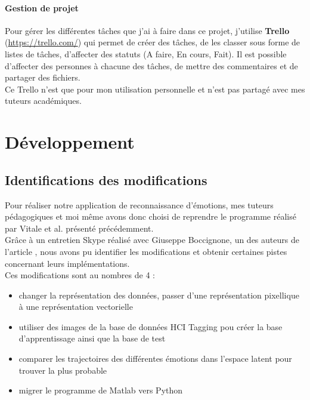 \documentclass[poster]{polytech/polytech}
\begin{document}
\subsection{Gestion de projet}
Pour gérer les différentes tâches que j'ai à faire dans ce projet, j'utilise \textbf{Trello} (\url{https://trello.com/}) qui permet de créer des tâches, de les classer sous forme de listes de tâches, d'affecter des statuts (A faire, En cours, Fait). Il est possible d'affecter des personnes à chacune des tâches, de mettre des commentaires et de partager des fichiers.\\
Ce Trello n'est que pour mon utilisation personnelle et n'est pas partagé avec mes tuteurs académiques.


\part{Développement}
\label{part:part_dev}

\chapter{Identifications des modifications}
Pour réaliser notre application de reconnaissance d'émotions, mes tuteurs pédagogiques et moi même avons donc choisi de reprendre le programme réalisé par Vitale et al. présenté précédemment.\\
Grâce à un entretien Skype réalisé avec Giuseppe Boccignone, un des auteurs de l'article \cite{italiens}, nous avons pu identifier les modifications et obtenir certaines pistes concernant leurs implémentations.\\
Ces modifications sont au nombres de 4 :
\begin{itemize}
\item changer la représentation des données, passer d'une représentation pixellique à une représentation vectorielle
\item utiliser des images de la base de données HCI Tagging pou créer la base d'apprentissage ainsi que la base de test
\item comparer les trajectoires des différentes émotions dans l'espace latent pour trouver la plus probable
\item migrer le programme de Matlab vers Python
\end{itemize}
\newpage
\end{document}
